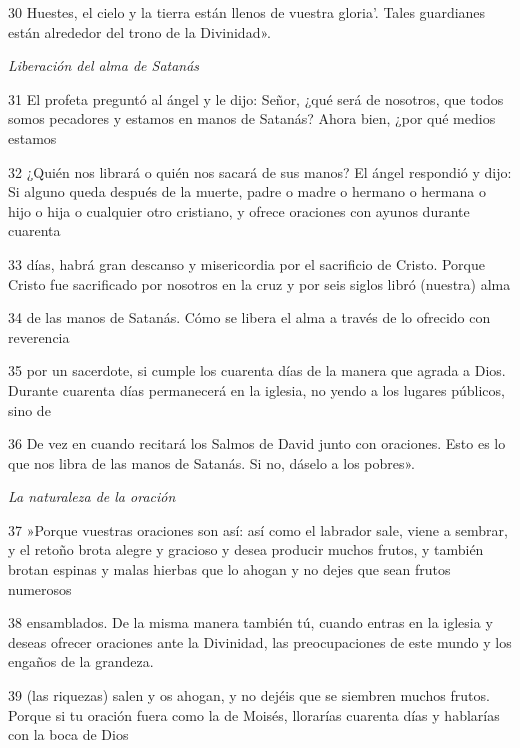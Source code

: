 \par 30 Huestes, el cielo y la tierra están llenos de vuestra gloria'. Tales guardianes están alrededor del trono de la Divinidad».

\par \textit{Liberación del alma de Satanás}

\par 31 El profeta preguntó al ángel y le dijo: Señor, ¿qué será de nosotros, que todos somos pecadores y estamos en manos de Satanás? Ahora bien, ¿por qué medios estamos

\par 32 ¿Quién nos librará o quién nos sacará de sus manos? El ángel respondió y dijo: Si alguno queda después de la muerte, padre o madre o hermano o hermana o hijo o hija o cualquier otro cristiano, y ofrece oraciones con ayunos durante cuarenta

\par 33 días, habrá gran descanso y misericordia por el sacrificio de Cristo. Porque Cristo fue sacrificado por nosotros en la cruz y por seis siglos libró (nuestra) alma

\par 34 de las manos de Satanás. Cómo se libera el alma a través de lo ofrecido con reverencia

\par 35 por un sacerdote, si cumple los cuarenta días de la manera que agrada a Dios. Durante cuarenta días permanecerá en la iglesia, no yendo a los lugares públicos, sino de

\par 36 De vez en cuando recitará los Salmos de David junto con oraciones. Esto es lo que nos libra de las manos de Satanás. Si no, dáselo a los pobres».

\par \textit{La naturaleza de la oración}

\par 37 »Porque vuestras oraciones son así: así como el labrador sale, viene a sembrar, y el retoño brota alegre y gracioso y desea producir muchos frutos, y también brotan espinas y malas hierbas que lo ahogan y no dejes que sean frutos numerosos

\par 38 ensamblados. De la misma manera también tú, cuando entras en la iglesia y deseas ofrecer oraciones ante la Divinidad, las preocupaciones de este mundo y los engaños de la grandeza.

\par 39 (las riquezas) salen y os ahogan, y no dejéis que se siembren muchos frutos. Porque si tu oración fuera como la de Moisés, llorarías cuarenta días y hablarías con la boca de Dios


